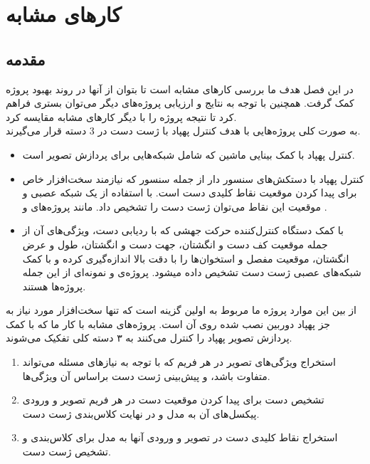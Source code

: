 \chapter{کار‌های مشابه}
\section{مقدمه}
در این فصل هدف ما بررسی کارهای مشابه است تا بتوان از آنها در روند بهبود پروژه کمک گرفت. همچنین با توجه به نتایج و ارزیابی پروژه‌های دیگر می‌توان بستری فراهم کرد تا نتیجه پروژه را با دیگر کارهای مشابه مقایسه کرد.
\\
به صورت کلی پروژه‌هایی با هدف کنترل پهپاد با ژست دست در 3 دسته قرار می‌گیرند.
\begin{itemize}
    \item کنترل پهپاد با کمک بینایی ماشین که شامل شبکه‌هایی برای پردازش تصویر است. 
    \item کنترل پهپاد با دستکش‌های سنسور دار از جمله سنسور  که نیازمند سخت‌افزار خاص برای پیدا کردن موقعیت نقاط کلیدی دست است. با استفاده از یک شبکه عصبی و موقعیت این نقاط می‌توان ژست دست را تشخیص داد. مانند پروژه‌های  \cite{yoo2022motion} و \cite{ma2017hand}.
    \item با کمک دستگاه کنترل‌کننده حرکت جهشی که با ردیابی دست، ویژگی‌های آن از جمله موقعیت کف دست و انگشتان، جهت دست و انگشتان، طول و عرض انگشتان، موقعیت مفصل و استخوان‌ها را با دقت بالا اندازه‌گیری کرده و با کمک شبکه‌های عصبی ژست دست تشخیص داده میشود. پروژه‌ی
    \cite{hu2020deep} و \cite{sarkar2016gesture} نمونه‌ای از این جمله پروژه‌ها هستند. 
\end{itemize}

از بین این موارد پروژه ما مربوط به اولین گزینه است که تنها سخت‌افزار مورد نیاز به جز پهپاد دوربین نصب شده روی آن است. 
پروژه‌های مشابه با کار ما که با کمک پردازش تصویر پهپاد را کنترل می‌‌کنند به ۳ دسته کلی تفکیک می‌شوند.
\begin{enumerate}
    \item استخراج ویژگی‌های تصویر در هر فریم که با توجه به نیاز‌های مسئله می‌تواند متفاوت باشد، و پیش‌بینی ژست دست براساس آن ویژگی‌ها.
    \item تشخیص دست ‌برای پیدا کردن موقعیت دست در هر فریم تصویر و ورودی پیکسل‌های  آن به مدل و در نهایت کلاس‌بندی ژست دست.
    \item استخراج نقاط کلیدی  دست در تصویر و ورودی آنها به مدل برای کلاس‌بندی و تشخیص ژست دست.
\end{enumerate}

